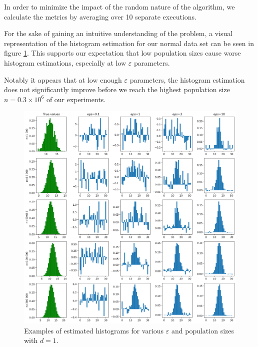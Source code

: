 \documentclass[12pt]{article}
\renewcommand{\epsilon}{\varepsilon}
\begin{document}
In order to minimize the impact of the random nature of the algorithm, we calculate the metrics by averaging over 10 separate executions. \bigskip

For the sake of gaining an intuitive understanding of the problem, a visual representation of the histogram estimation for our normal data set can be seen in figure \ref{fig:histogram_matrix}. This supports our expectation that low population sizes cause worse histogram estimations, especially at low $\epsilon$ parameters.

Notably it appears that at low enough $\epsilon$ parameters, the histogram estimation does not significantly improve before we reach the highest population size $n=0.3 \times 10^6$ of our experiments.

\begin{figure}
    \centering
    \includegraphics[width=\textwidth]{imgs/histogram_matrix.png}
    \caption{Examples of estimated histograms for various $\epsilon$ and population sizes with $d=1$.}
    \label{fig:histogram_matrix}
\end{figure}
\end{document}
